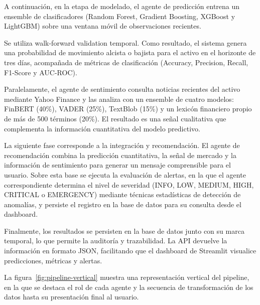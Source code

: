 A continuación, en la etapa de modelado, el agente de predicción entrena un  ensemble de clasificadores    (Random Forest, Gradient Boosting, XGBoost y LightGBM) sobre una ventana móvil de
  observaciones recientes. 
  
  Se utiliza  walk-forward validation temporal. Como resultado, el    
  sistema genera una probabilidad de movimiento alcista o bajista para el activo en el        
  horizonte de tres días, acompañada de métricas de clasificación (Accuracy, Precision,       
  Recall, F1-Score y AUC-ROC).

Paralelamente, el agente de sentimiento consulta noticias recientes del activo
  mediante Yahoo Finance y las analiza con un ensemble de cuatro modelos: FinBERT
  (40\%), VADER (25\%), TextBlob (15\%) y un lexicón financiero propio de más de
  500 términos (20\%). El resultado es una señal cualitativa que complementa la
  información cuantitativa del modelo predictivo.

  La siguiente fase corresponde a la integración y recomendación. El agente de
  recomendación combina la predicción cuantitativa, la señal de mercado y la
  información de sentimiento para generar un mensaje comprensible para el usuario.
  Sobre esta base se ejecuta la evaluación de alertas, en la que el agente
  correspondiente determina el nivel de severidad (INFO, LOW, MEDIUM, HIGH, CRITICAL
  o EMERGENCY) mediante técnicas estadísticas de detección de anomalías, y persiste
  el registro en la base de datos para su consulta desde el dashboard.

  Finalmente, los resultados se persisten en la base de datos junto con su marca
  temporal, lo que permite la auditoría y trazabilidad. La API devuelve la
  información en formato JSON, facilitando que el dashboard de Streamlit visualice
  predicciones, métricas y alertas.

  
La figura~\ref{fig:pipeline-vertical} muestra una representación vertical del pipeline, en la que se destaca el rol de cada agente y la secuencia de transformación de los datos hasta su presentación final al usuario.


